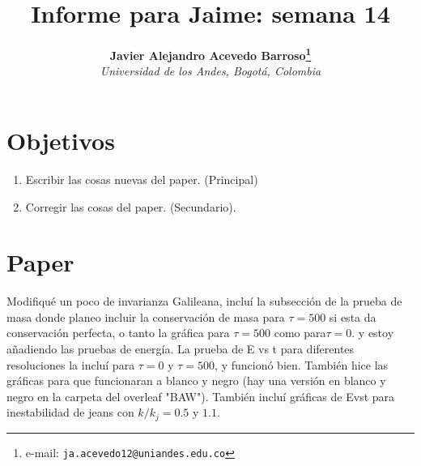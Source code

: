 \documentclass[notitlepage,letterpaper,12pt]{article} %
\begin{document}
\title{Informe para Jaime: semana 14}
\author{
\textbf{Javier Alejandro Acevedo Barroso\thanks{e-mail: \texttt{ja.acevedo12@uniandes.edu.co}}}\\
\textit{Universidad de los Andes, Bogotá, Colombia}\\
} %

\maketitle %






 

\section{Objetivos}
\begin{enumerate}
\item Escribir las cosas nuevas del paper. (Principal)
\item Corregir las cosas del paper. (Secundario).
\end{enumerate}

\section{Paper}
Modifiqué un poco de invarianza Galileana, incluí la subsección de la prueba de masa donde planeo incluir la conservación de masa para $\tau=500$ si esta da conservación perfecta, o tanto la gráfica para $\tau=500$ como para$\tau=0$. y estoy añadiendo las pruebas de energía. La prueba de E vs t para diferentes resoluciones la incluí para $\tau = 0$ y $\tau = 500$, y funcionó bien.
También hice las gráficas para que funcionaran a blanco y negro (hay una versión en blanco y negro en la carpeta del overleaf "BAW").
También incluí gráficas de Evst para inestabilidad de jeans con $k/k_j=0.5$ y $1.1$.
\end{document}

